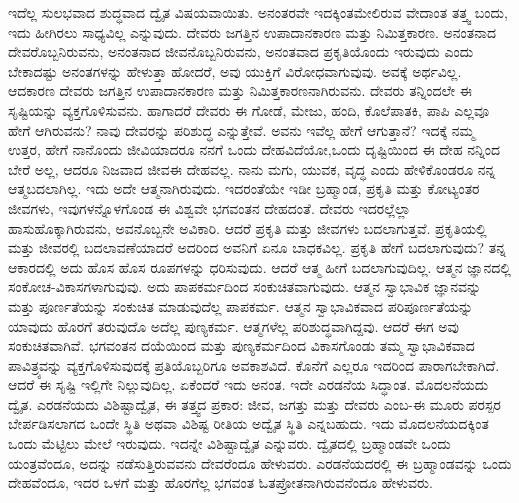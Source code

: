 ಇದೆಲ್ಲ ಸುಲಭವಾದ ಶುದ್ಧವಾದ ದ್ವೈತ ವಿಷಯವಾಯಿತು. ಅನಂತರವೇ ಇದಕ್ಕಿಂತ\break ಮೇಲಿರುವ ವೇದಾಂತ ತತ್ತ್ವ ಬಂದು, ಇದು ಹೀಗಿರಲು ಸಾಧ್ಯವಿಲ್ಲ ಎನ್ನುವುದು. ದೇವರು ಜಗತ್ತಿನ ಉಪಾದಾನಕಾರಣ ಮತ್ತು ನಿಮಿತ್ತಕಾರಣ. ಅನಂತನಾದ ದೇವರೊಬ್ಬ\-ನಿರುವನು, ಅನಂತನಾದ ಜೀವನೊಬ್ಬನಿರುವನು, ಅನಂತವಾದ ಪ್ರಕೃತಿಯೊಂದು ಇರುವುದು ಎಂದು ಬೇಕಾದಷ್ಟು ಅನಂತಗಳನ್ನು ಹೇಳುತ್ತಾ ಹೋದರೆ, ಅವು ಯುಕ್ತಿಗೆ ವಿರೋಧವಾಗುವುವು. ಅವಕ್ಕೆ ಅರ್ಥವಿಲ್ಲ. ಆದಕಾರಣ ದೇವರು ಜಗತ್ತಿನ ಉಪಾದಾನಕಾರಣ ಮತ್ತು ನಿಮಿತ್ತಕಾರಣನಾಗಿರುವನು. ದೇವರು ತನ್ನಿಂದಲೇ ಈ ಸೃಷ್ಟಿಯನ್ನು ವ್ಯಕ್ತಗೊಳಿಸುವನು. ಹಾಗಾದರೆ ದೇವರು ಈ ಗೋಡೆ, ಮೇಜು, ಹಂದಿ, ಕೊಲೆಪಾತಕಿ, ಪಾಪಿ ಎಲ್ಲವೂ ಹೇಗೆ ಆಗಿರುವನು? ನಾವು ದೇವರನ್ನು ಪರಿಶುದ್ಧ ಎನ್ನುತ್ತೇವೆ. ಅವನು ಇವೆಲ್ಲ ಹೇಗೆ ಆಗುತ್ತಾನೆ? ಇದಕ್ಕೆ ನಮ್ಮ ಉತ್ತರ, ಹೇಗೆ ನಾನೊಂದು ಜೀವಿಯಾದರೂ ನನಗೆ ಒಂದು ದೇಹವಿದೆಯೋ,\break ಒಂದು ದೃಷ್ಟಿಯಿಂದ ಈ ದೇಹ ನನ್ನಿಂದ ಬೇರೆ ಅಲ್ಲ, ಆದರೂ ನಿಜವಾದ ಜೀವ\break ಈ ದೇಹವಲ್ಲ. ನಾನು ಮಗು, ಯುವಕ, ವೃದ್ಧ ಎಂದು ಹೇಳಿಕೊಂಡರೂ ನನ್ನ ಆತ್ಮ\break ಬದಲಾಗಿಲ್ಲ. ಇದು ಅದೇ ಆತ್ಮನಾಗಿರುವುದು. ಇದರಂತೆಯೇ ಇಡೀ ಬ್ರಹ್ಮಾಂಡ, ಪ್ರಕೃತಿ ಮತ್ತು ಕೋಟ್ಯಂತರ ಜೀವಗಳು, ಇವುಗಳನ್ನೊಳಗೊಂಡ ಈ ವಿಶ್ವವೇ ಭಗವಂತನ ದೇಹದಂತೆ. ದೇವರು ಇದರಲ್ಲೆಲ್ಲಾ ಹಾಸುಹೊಕ್ಕಾಗಿರುವನು, ಅವನೊಬ್ಬನೇ ಅವಿಕಾರಿ. ಆದರೆ ಪ್ರಕೃತಿ ಮತ್ತು ಜೀವಗಳು ಬದಲಾಗುತ್ತವೆ. ಪ್ರಕೃತಿಯಲ್ಲಿ ಮತ್ತು ಜೀವರಲ್ಲಿ ಬದಲಾವಣೆಯಾದರೆ ಅದರಿಂದ ಅವನಿಗೆ ಏನೂ ಬಾಧಕವಿಲ್ಲ. ಪ್ರಕೃತಿ ಹೇಗೆ ಬದಲಾಗುವುದು? ತನ್ನ ಆಕಾರದಲ್ಲಿ ಅದು ಹೊಸ ಹೊಸ ರೂಪಗಳನ್ನು ಧರಿಸುವುದು. ಆದರೆ ಆತ್ಮ ಹೀಗೆ ಬದಲಾಗುವುದಿಲ್ಲ. ಆತ್ಮನ ಜ್ಞಾನದಲ್ಲಿ ಸಂಕೋಚ-ವಿಕಾಸಗಳಾಗುವುವು. ಅದು ಪಾಪಕರ್ಮದಿಂದ ಸಂಕುಚಿತವಾಗುವುದು. ಆತ್ಮನ ಸ್ವಾಭಾವಿಕ ಜ್ಞಾನವನ್ನು ಮತ್ತು ಪೂರ್ಣತೆಯನ್ನು ಸಂಕುಚಿತ ಮಾಡುವುದೆಲ್ಲ ಪಾಪಕರ್ಮ. ಆತ್ಮನ ಸ್ವಾಭಾವಿಕವಾದ ಪರಿಪೂರ್ಣತೆಯನ್ನು ಯಾವುದು ಹೊರಗೆ ತರುವುದೊ ಅದೆಲ್ಲ ಪುಣ್ಯಕರ್ಮ. ಆತ್ಮಗಳೆಲ್ಲ ಪರಿಶುದ್ಧವಾಗಿದ್ದವು. ಆದರೆ ಈಗ ಅವು ಸಂಕುಚಿತವಾಗಿವೆ. ಭಗವಂತನ ದಯೆಯಿಂದ ಮತ್ತು ಪುಣ್ಯಕರ್ಮದಿಂದ ವಿಕಾಸಗೊಂಡು ತಮ್ಮ ಸ್ವಾಭಾವಿಕವಾದ ಪಾವಿತ್ರ್ಯವನ್ನು ವ್ಯಕ್ತಗೊಳಿಸುವುದಕ್ಕೆ ಪ್ರತಿಯೊಬ್ಬರಿಗೂ ಅವಕಾಶವಿದೆ. ಕೊನೆಗೆ ಎಲ್ಲರೂ ಇದರಿಂದ ಪಾರಾಗಬೇಕಾಗಿದೆ. ಆದರೆ ಈ ಸೃಷ್ಟಿ ಇಲ್ಲಿಗೇ ನಿಲ್ಲುವುದಿಲ್ಲ. ಏಕೆಂದರೆ ಇದು ಅನಂತ. ಇದೇ ಎರಡನೆಯ ಸಿದ್ಧಾಂತ. ಮೊದಲನೆಯದು ದ್ವೈತ. ಎರಡನೆಯದು ವಿಶಿಷ್ಟಾದ್ವೈತ, ಈ ತತ್ತ್ವದ ಪ್ರಕಾರ: ಜೀವ, ಜಗತ್ತು ಮತ್ತು ದೇವರು ಎಂಬ-ಈ ಮೂರು ಪರಸ್ಪರ ಬೇರ್ಪಡಿಸಲಾಗದ ಒಂದೇ ಸ್ಥಿತಿ ಅಥವಾ ವಿಶಿಷ್ಟ ರೀತಿಯ ಅದ್ವೈತ ಸ್ಥಿತಿ ಎನ್ನಬಹುದು. ಇದು ಮೊದಲನೆಯದಕ್ಕಿಂತ ಒಂದು ಮೆಟ್ಟಿಲು ಮೇಲೆ ಇರುವುದು. ಇದನ್ನೇ ವಿಶಿಷ್ಟಾದ್ವೈತ ಎನ್ನುವರು. ದ್ವೈತದಲ್ಲಿ ಬ್ರಹ್ಮಾಂಡವೇ ಒಂದು ಯಂತ್ರವೆಂದೂ, ಅದನ್ನು ನಡೆಸುತ್ತಿರುವವನು ದೇವರೆಂದೂ ಹೇಳುವರು. ಎರಡನೆಯದರಲ್ಲಿ ಈ ಬ್ರಹ್ಮಾಂಡವನ್ನು ಒಂದು ದೇಹವೆಂದೂ, ಇದರ ಒಳಗೆ ಮತ್ತು ಹೊರಗೆಲ್ಲ ಭಗವಂತ ಓತಪ್ರೋತನಾಗಿರುವನೆಂದೂ ಹೇಳುವರು.

